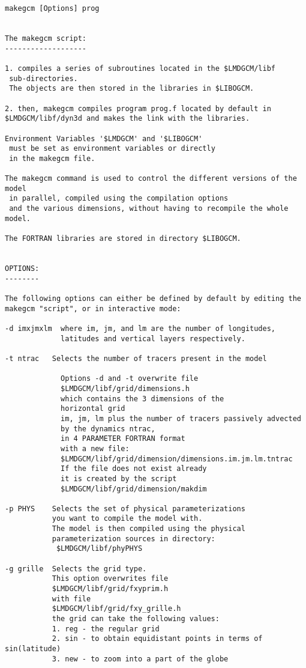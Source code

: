 {\footnotesize
\begin{verbatim}
makegcm [Options] prog


The makegcm script:
-------------------

1. compiles a series of subroutines located in the $LMDGCM/libf
 sub-directories.
 The objects are then stored in the libraries in $LIBOGCM.

2. then, makegcm compiles program prog.f located by default in
$LMDGCM/libf/dyn3d and makes the link with the libraries.

Environment Variables '$LMDGCM' and '$LIBOGCM'
 must be set as environment variables or directly
 in the makegcm file.

The makegcm command is used to control the different versions of the model
 in parallel, compiled using the compilation options 
 and the various dimensions, without having to recompile the whole model.

The FORTRAN libraries are stored in directory $LIBOGCM.


OPTIONS:
--------

The following options can either be defined by default by editing the
makegcm "script", or in interactive mode:

-d imxjmxlm  where im, jm, and lm are the number of longitudes,
             latitudes and vertical layers respectively.

-t ntrac   Selects the number of tracers present in the model

             Options -d and -t overwrite file 
             $LMDGCM/libf/grid/dimensions.h
             which contains the 3 dimensions of the
             horizontal grid 
             im, jm, lm plus the number of tracers passively advected
             by the dynamics ntrac,
             in 4 PARAMETER FORTRAN format 
             with a new file:
             $LMDGCM/libf/grid/dimension/dimensions.im.jm.lm.tntrac
             If the file does not exist already
             it is created by the script
             $LMDGCM/libf/grid/dimension/makdim

-p PHYS    Selects the set of physical parameterizations
           you want to compile the model with.
           The model is then compiled using the physical
           parameterization sources in directory:
            $LMDGCM/libf/phyPHYS

-g grille  Selects the grid type.
           This option overwrites file
           $LMDGCM/libf/grid/fxyprim.h
           with file
           $LMDGCM/libf/grid/fxy_grille.h
           the grid can take the following values:
           1. reg - the regular grid
           2. sin - to obtain equidistant points in terms of sin(latitude)
           3. new - to zoom into a part of the globe


\end{verbatim}}
